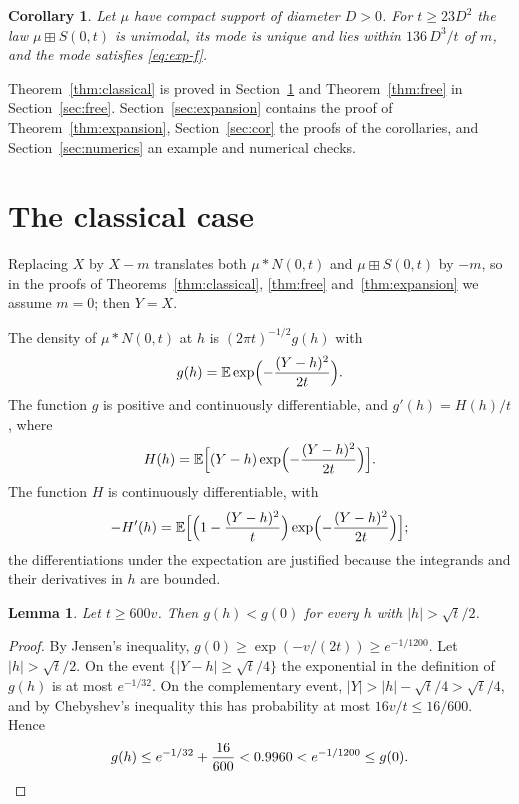 \documentclass[11pt]{amsart}
\newtheorem{lemma}[theorem]{Lemma}
\newtheorem{corollary}[theorem]{Corollary}
\theoremstyle{definition}
\newcommand{\E}{\mathbb{E}}
\begin{document}
\begin{corollary}\label{cor:compact}
Let $\mu$ have compact support of diameter $D>0$. For $t\ge 23D^2$ the law $\mu\boxplus S(0,t)$ is unimodal, its mode
is unique and lies within $136\,D^3/t$ of $m$, and the mode satisfies \eqref{eq:exp-f}.
\end{corollary}

Theorem~\ref{thm:classical} is proved in Section~\ref{sec:classical} and Theorem~\ref{thm:free} in
Section~\ref{sec:free}. Section~\ref{sec:expansion} contains the proof of Theorem~\ref{thm:expansion},
Section~\ref{sec:cor} the proofs of the corollaries, and Section~\ref{sec:numerics} an example and numerical checks.

\section{The classical case}\label{sec:classical}

Replacing $X$ by $X-m$ translates both $\mu*N(0,t)$ and $\mu\boxplus S(0,t)$ by $-m$, so in the proofs of
Theorems~\ref{thm:classical}, \ref{thm:free} and~\ref{thm:expansion} we assume $m=0$; then $Y=X$.

The density of $\mu*N(0,t)$ at $h$ is $(2\pi t)^{-1/2}g(h)$ with
\[
g(h)=\E\exp\Bigl(-\frac{(Y-h)^2}{2t}\Bigr).
\]
The function $g$ is positive and continuously differentiable, and $g'(h)=H(h)/t$, where
\[
H(h)=\E\Bigl[(Y-h)\exp\Bigl(-\frac{(Y-h)^2}{2t}\Bigr)\Bigr].
\]
The function $H$ is continuously differentiable, with
\begin{equation}\label{eq:Hprime}
-H'(h)=\E\Bigl[\Bigl(1-\frac{(Y-h)^2}{t}\Bigr)\exp\Bigl(-\frac{(Y-h)^2}{2t}\Bigr)\Bigr];
\end{equation}
the differentiations under the expectation are justified because the integrands and their derivatives in $h$ are
bounded.

\begin{lemma}\label{lem:c-window}
Let $t\ge600v$. Then $g(h)<g(0)$ for every $h$ with $|h|>\sqrt t/2$.
\end{lemma}

\begin{proof}
By Jensen's inequality, $g(0)\ge\exp(-v/(2t))\ge e^{-1/1200}$. Let $|h|>\sqrt t/2$. On the event
$\{|Y-h|\ge\sqrt t/4\}$ the exponential in the definition of $g(h)$ is at most $e^{-1/32}$. On the complementary
event, $|Y|>|h|-\sqrt t/4>\sqrt t/4$, and by Chebyshev's inequality this has probability at most $16v/t\le 16/600$.
Hence
\[
g(h)\le e^{-1/32}+\frac{16}{600}<0.9960<e^{-1/1200}\le g(0).\qedhere
\]
\end{proof}
\end{document}
